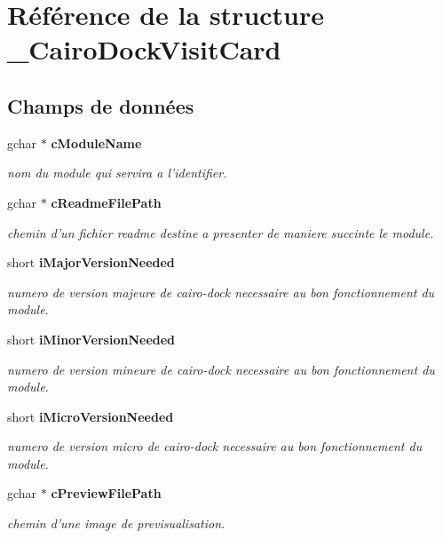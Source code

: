 \section{Référence de la structure \_\-CairoDockVisitCard}
\label{struct__CairoDockVisitCard}
\subsection*{Champs de données}
\begin{CompactItemize}
\item 
gchar $\ast$ {\bf cModuleName}
\begin{CompactList}\small\item\em nom du module qui servira a l'identifier. \item\end{CompactList}\item 
gchar $\ast$ {\bf cReadmeFilePath}
\begin{CompactList}\small\item\em chemin d'un fichier readme destine a presenter de maniere succinte le module. \item\end{CompactList}\item 
short {\bf iMajorVersionNeeded}
\begin{CompactList}\small\item\em numero de version majeure de cairo-dock necessaire au bon fonctionnement du module. \item\end{CompactList}\item 
short {\bf iMinorVersionNeeded}
\begin{CompactList}\small\item\em numero de version mineure de cairo-dock necessaire au bon fonctionnement du module. \item\end{CompactList}\item 
short {\bf iMicroVersionNeeded}
\begin{CompactList}\small\item\em numero de version micro de cairo-dock necessaire au bon fonctionnement du module. \item\end{CompactList}\item 
gchar $\ast$ {\bf cPreviewFilePath}
\begin{CompactList}\small\item\em chemin d'une image de previsualisation. \item\end{CompactList}\item 

\end{CompactItemize}
